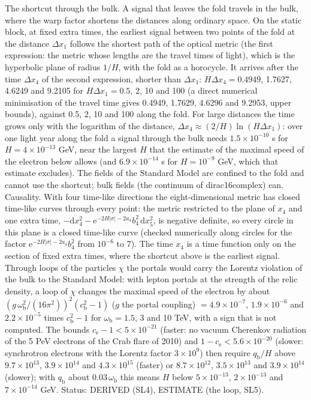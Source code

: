 \documentclass[
  10pt,
]{article}
\begin{document}
The shortcut through the bulk. A signal that leaves the fold travels in
the bulk, where the warp factor shortens the distances along ordinary
space. On the static block, at fixed extra times, the earliest signal
between two points of the fold at the distance \(\Delta x_1\) follows
the shortest path of the optical metric (the first expression: the
metric whose lengths are the travel times of light), which is the
hyperbolic plane of radius \(1/H\), with the fold as a horocycle. It
arrives after the time \(\Delta x_4\) of the second expression, shorter
than \(\Delta x_1\): \(H\Delta x_4 = 0.4949\), 1.7627, 4.6249 and 9.2105
for \(H\Delta x_1 = 0.5\), 2, 10 and 100 (a direct numerical
minimisation of the travel time gives 0.4949, 1.7629, 4.6296 and 9.2953,
upper bounds), against 0.5, 2, 10 and 100 along the fold. For large
distances the time grows only with the logarithm of the distance,
\(\Delta x_4 \approx (2/H)\ln(H\Delta x_1)\): over one light year along
the fold a signal through the bulk needs \(1.5\times10^{-10}\) s for
\(H = 4\times10^{-13}\) GeV, near the largest \(H\) that the estimate of
the maximal speed of the electron below allows (and
\(6.9\times10^{-14}\) s for \(H = 10^{-9}\) GeV, which that estimate
excludes). The fields of the Standard Model are confined to the fold and
cannot use the shortcut; bulk fields (the continuum of dirac16complex)
can. Causality. With four time-like directions the eight-dimensional
metric has closed time-like curves through every point: the metric
restricted to the plane of \(x_4\) and one extra time,
\(-\mathrm{d}x_4^2 - \mathrm{e}^{-2H\lvert\sigma\rvert - 2a_4}b_4^2\,\mathrm{d}x_5^2\),
is negative definite, so every circle in this plane is a closed
time-like curve (checked numerically along circles for the factor
\(\mathrm{e}^{-2H\lvert\sigma\rvert - 2a_4}b_4^2\) from \(10^{-6}\) to
7). The time \(x_4\) is a time function only on the section of fixed
extra times, where the shortcut above is the earliest signal. Through
loops of the particles \(\chi\) the portals would carry the Lorentz
violation of the bulk to the Standard Model: with lepton portals at the
strength of the relic density, a loop of \(\chi\) changes the maximal
speed of the electron by about
\((g\,\omega_{\mathrm{b}}^2/(16\pi^2))^2(c_{\mathrm{b}}^2 - 1)\) (\(g\)
the portal coupling) \(= 4.9\times10^{-7}\), \(1.9\times10^{-6}\) and
\(2.2\times10^{-5}\) times \(c_{\mathrm{b}}^2 - 1\) for
\(\omega_{\mathrm{b}} = 1.5\), 3 and 10 TeV, with a sign that is not
computed. The bounds \(c_{\mathrm{e}} - 1 < 5\times10^{-21}\) (faster:
no vacuum Cherenkov radiation of the 5 PeV electrons of the Crab flare
of 2010) and \(1 - c_{\mathrm{e}} < 5.6\times10^{-20}\) (slower:
synchrotron electrons with the Lorentz factor \(3\times10^9\)) then
require \(q_{\mathrm{b}}/H\) above \(9.7\times10^{13}\),
\(3.9\times10^{14}\) and \(4.3\times10^{15}\) (faster) or
\(8.7\times10^{12}\), \(3.5\times10^{13}\) and \(3.9\times10^{14}\)
(slower); with \(q_{\mathrm{b}}\) about \(0.03\,\omega_{\mathrm{b}}\)
this means \(H\) below \(5\times10^{-13}\), \(2\times10^{-13}\) and
\(7\times10^{-14}\) GeV. Status: DERIVED (SL4), ESTIMATE (the loop,
SL5).
\end{document}
